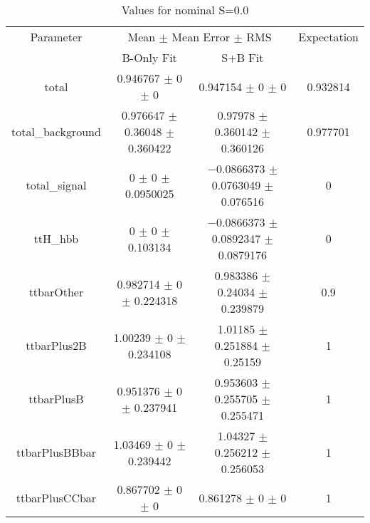 \begin{table}
\centering
\caption{Values for nominal S=0.0}
\begin{tabular}{cccc}
\toprule
Parameter & \multicolumn{2}{c}{Mean $\pm$ Mean Error $\pm$ RMS} & Expectation\\
 & B-Only Fit & S+B Fit & \\
\midrule
total & \num{0.946767} $\pm$ \num{0} $\pm$ \num{0} & \num{0.947154} $\pm$ \num{0} $\pm$ \num{0} & \num{0.932814}\\
total\_background & \num{0.976647} $\pm$ \num{0.36048} $\pm$ \num{0.360422} & \num{0.97978} $\pm$ \num{0.360142} $\pm$ \num{0.360126} & \num{0.977701}\\
total\_signal & \num{0} $\pm$ \num{0} $\pm$ \num{0.0950025} & \num{-0.0866373} $\pm$ \num{0.0763049} $\pm$ \num{0.076516} & \num{0}\\
ttH\_hbb & \num{0} $\pm$ \num{0} $\pm$ \num{0.103134} & \num{-0.0866373} $\pm$ \num{0.0892347} $\pm$ \num{0.0879176} & \num{0}\\
ttbarOther & \num{0.982714} $\pm$ \num{0} $\pm$ \num{0.224318} & \num{0.983386} $\pm$ \num{0.24034} $\pm$ \num{0.239879} & \num{0.9}\\
ttbarPlus2B & \num{1.00239} $\pm$ \num{0} $\pm$ \num{0.234108} & \num{1.01185} $\pm$ \num{0.251884} $\pm$ \num{0.25159} & \num{1}\\
ttbarPlusB & \num{0.951376} $\pm$ \num{0} $\pm$ \num{0.237941} & \num{0.953603} $\pm$ \num{0.255705} $\pm$ \num{0.255471} & \num{1}\\
ttbarPlusBBbar & \num{1.03469} $\pm$ \num{0} $\pm$ \num{0.239442} & \num{1.04327} $\pm$ \num{0.256212} $\pm$ \num{0.256053} & \num{1}\\
ttbarPlusCCbar & \num{0.867702} $\pm$ \num{0} $\pm$ \num{0} & \num{0.861278} $\pm$ \num{0} $\pm$ \num{0} & \num{1}\\
\bottomrule
\end{tabular}
\end{table}